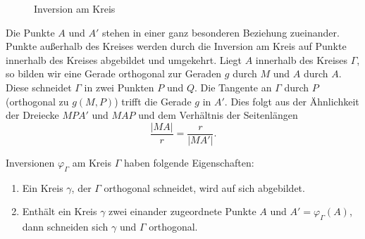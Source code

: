 \begin{figure}[ht]
    
    \caption{Inversion am Kreis}
\end{figure}

Die Punkte $A$ und $A'$ stehen in einer ganz besonderen Beziehung zueinander. Punkte außerhalb des
Kreises werden durch die Inversion am Kreis auf Punkte innerhalb des Kreises abgebildet und
umgekehrt. Liegt $A$ innerhalb des Kreises $\Gamma$, so bilden wir eine Gerade orthogonal zur
Geraden $g$ durch $M$ und $A$ durch $A$. Diese schneidet $\Gamma$ in zwei Punkten $P$ und $Q$. Die
Tangente an $\Gamma$ durch $P$ (orthogonal zu $g(M,P)$) trifft die Gerade $g$ in $A'$. Dies folgt
aus der Ähnlichkeit der Dreiecke $MPA'$ und $MAP$ und dem Verhältnis der Seitenlängen
$$
    \frac{|MA|}{r} = \frac{r}{|MA'|}.
$$
\begin{thm}\label{thm:satz.s4b}
    Inversionen $\varphi_\Gamma$ am Kreis $\Gamma$ haben folgende Eigenschaften:

    \renewcommand{\labelenumi}{\alph{enumi})} %
    \begin{enumerate}
        \item Ein Kreis $\gamma$, der $\Gamma$ orthogonal schneidet, wird auf sich abgebildet.

        \item Enthält ein Kreis $\gamma$ zwei einander zugeordnete Punkte $A$ und
            $A' = \varphi_\Gamma(A)$, dann schneiden sich $\gamma$ und $\Gamma$ orthogonal.

    \end{enumerate}
\end{thm}

